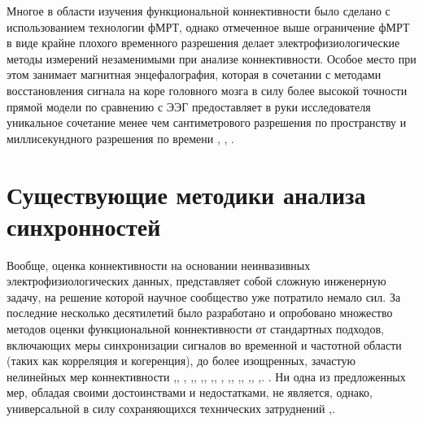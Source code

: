 Многое в области изучения функциональной коннективности было сделано с использованием технологии фМРТ,
однако отмеченное выше ограничение фМРТ в виде крайне плохого временного разрешения делает электрофизиологические
методы измерений незаменимыми при анализе коннективности. Особое место при этом занимает магнитная энцефалография,
которая в сочетании с методами восстановления сигнала на коре головного мозга
в силу более высокой точности прямой модели по сравнению с ЭЭГ предоставляет
в руки исследователя уникальное сочетание менее чем сантиметрового разрешения по пространству
и миллисекундного разрешения по времени ,
, .


\section{Существующие методики анализа синхронностей}

Вообще, оценка коннективности на основании неинвазивных электрофизиологических данных,
 представляет собой сложную инженерную задачу,
на решение которой научное сообщество уже потратило немало сил.
За последние несколько десятилетий было разработано и опробовано множество методов
оценки функциональной коннективности от стандартных подходов,
включающих меры синхронизации сигналов во временной и
частотной области (таких как корреляция и когеренция), до более изощренных,
зачастую нелинейных мер коннективности
,,
,
,,
,,
,,
,
,,
,,
,,
,.
.
Ни одна из предложенных мер, обладая своими достоинствами и недостатками, не является, однако, универсальной в силу
сохраняющихся технических затруднений ,.

